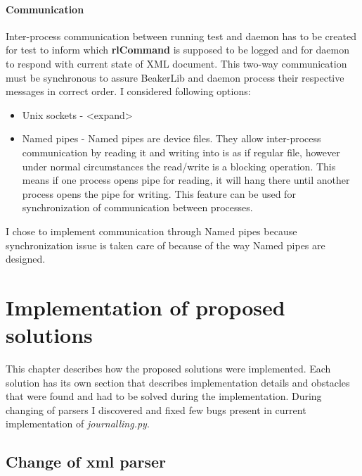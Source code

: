 \subsubsection{Communication}
Inter-process communication between running test and daemon has to be created for test to inform which \textbf{rlCommand} is supposed to be logged and for daemon to respond with current state of XML document. This two-way communication must be synchronous to assure BeakerLib and daemon process their respective messages in correct order. I considered following options:

\begin{itemize}
\item Unix sockets  -  <expand>
\item Named pipes - Named pipes are device files. They allow inter-process communication by reading it and writing into is as if regular file, however under normal circumstances the read/write is a blocking operation\cite{pipes_blocking}. This means if one process opens pipe for reading, it will hang there until another process opens the pipe for writing. This feature can be used for synchronization of communication between processes. 
\end{itemize}


I chose to implement communication through Named pipes because synchronization issue is taken care of because of the way Named pipes are designed.


\chapter{Implementation of proposed solutions}
\label{implementations}
This chapter describes how the proposed solutions were implemented. Each solution has its own section that describes implementation details and obstacles that were found and had to be solved during the implementation.
During changing of parsers I discovered and fixed few bugs present in current implementation of \textit{journalling.py}.

\section{Change of xml parser}
